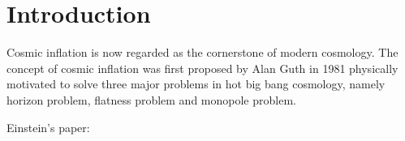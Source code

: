 \chapter{Introduction}

Cosmic inflation is now regarded as the cornerstone of modern cosmology. The concept of cosmic inflation was first proposed by Alan Guth in 1981 physically motivated to solve three major problems in hot big bang cosmology, namely horizon problem, flatness problem and monopole problem. 

Einstein's paper: \citet{Ness1} \citet{IR_band_1}
